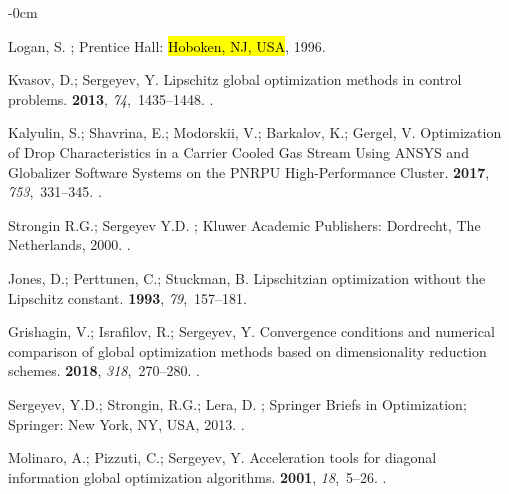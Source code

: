 \documentclass[mathematics,article,accept,pdftex,moreauthors]{Definitions/mdpi}
\begin{document}
\begin{adjustwidth}{-\extralength}{0cm}
\begin{thebibliography}{999}
Logan, S.
; Prentice Hall: \hl{Hoboken, NJ, USA},  1996.

Kvasov, D.; Sergeyev, Y.
\newblock Lipschitz global optimization methods in control problems.
 {\bf 2013}, {\em 74},~1435--1448.
.

Kalyulin, S.; Shavrina, E.; Modorskii, V.; Barkalov, K.; Gergel, V.
\newblock Optimization of Drop Characteristics in a Carrier Cooled Gas Stream
  Using \uppercase{ANSYS} and \uppercase{G}lobalizer Software Systems on the
  \uppercase{PNRPU} High-Performance Cluster.
 {\bf 2017},
  {\em 753},~331--345.
.

{Strongin R.G.; Sergeyev Y.D.}
; Kluwer Academic Publishers: Dordrecht, The Netherlands, 2000.
.

Jones, D.; Perttunen, C.; Stuckman, B.
\newblock Lipschitzian optimization without the \uppercase{L}ipschitz constant.
 {\bf 1993}, {\em 79},~157--181.

Grishagin, V.; Israfilov, R.; Sergeyev, Y.
\newblock Convergence conditions and numerical comparison of global
  optimization methods based on dimensionality reduction schemes.
 {\bf 2018}, {\em 318},~270--280.
.

{Sergeyev, Y.D.; Strongin, R.G.; Lera, D}.
; Springer Briefs in Optimization; Springer: New York, NY, USA, 2013.
.

Molinaro, A.; Pizzuti, C.; Sergeyev, Y.
\newblock Acceleration tools for diagonal information global optimization
  algorithms.
 {\bf 2001}, {\em
  18},~5--26.
.


\end{thebibliography}
\end{adjustwidth}
\end{document}
